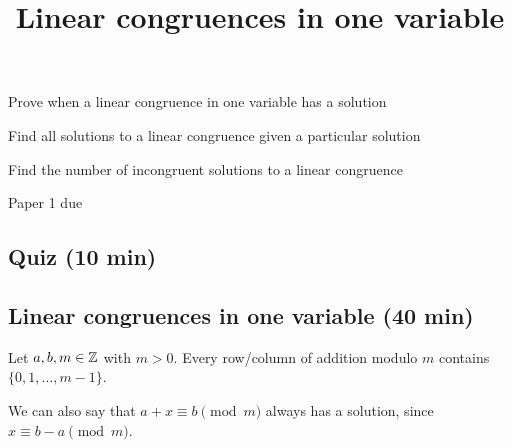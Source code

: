 \documentclass{../ximera}
\title{Linear congruences in one variable}
\begin{document}
\begin{abstract}
\end{abstract}
\maketitle

\begin{obj}
	\item Prove when a linear congruence in one variable has a solution
	\item Find all solutions to a linear congruence given a particular solution
	\item Find the number of incongruent solutions to a linear congruence
\end{obj}

\begin{pre} \item Paper 1 due
\end{pre}
\subsection{Quiz (10 min)}

\subsection{Linear congruences in one variable (40 min)}
\begin{rem}\label{remark-add-inverse}
Let $a,b,m\in\mathbb Z$ with $m>0$. Every row/column of addition modulo $m$ contains $\{0,1,\dots,m-1\}$. 

We can also say that $a+x\equiv b\pmod m$ always has a solution, since $x\equiv b-a\pmod m$.
\end{rem}
\end{document}

